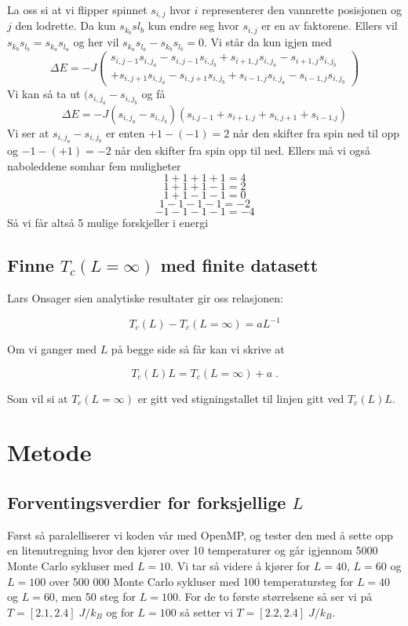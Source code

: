 \documentclass[reprint,english,notitlepage]{revtex4-1}  %
\begin{document}
La oss si at vi flipper spinnet $s_{i,j}$ hvor $i$ representerer den vannrette posisjonen og $j$ den lodrette. Da kun $s_{k_b}s{l_b}$ kun endre seg hvor $s_{i,j}$ er en av faktorene. Ellers vil $s_{k_b}s_{l_b}=s_{k_a}s_{l_a}$ og her vil $s_{k_a}s_{l_a}-s_{k_b}s_{l_b}=0$. Vi står da kun igjen med
$$
\Delta E= -J \begin{pmatrix} s_{i,j-1}s_{i,j_a}-s_{i,j-1}s_{i,j_b}+s_{i+1,j}s_{i,j_a}-s_{i+1,j}s_{i,j_b} \\+ s_{i,j+1}s_{i,j_a}-s_{i,j+1}s_{i,j_b}+s_{i-1,j}s_{i,j_a}-s_{i-1,j}s_{i,j_b}\end{pmatrix}
$$
Vi kan så ta ut $(s_{i,j_a}-s_{i,j_b}$ og få
$$
\Delta E=-J(s_{i,j_a}-s_{i,j_b})(
s_{i.j-1}+s_{i+1,j} +s_{i,j+1}+s_{i-1.j}
)
$$
Vi ser at $s_{i,j_a}-s_{i,j_b}$ er enten $+1-(-1)=2$ når den skifter fra spin ned til opp og $-1-(+1)=-2$ når den skifter fra spin opp til ned. Ellers må vi også naboleddene somhar fem muligheter
$$
1+1+1+1=4
$$
$$
1+1+1-1=2
$$
$$
1+1-1-1=0
$$
$$
1-1-1-1=-2
$$
$$
-1-1-1-1=-4
$$
Så vi får altså 5 mulige forskjeller i energi

\subsection*{Finne $T_c \left ( L = \infty \right ) $ med finite datasett}

Lars Onsager sien analytiske resultater gir oss relasjonen:

$$ T_c \left ( L \right ) - T_c \left ( L = \infty \right ) = aL^{-1}$$

Om vi ganger med $L$ på begge side så får kan vi skrive at

\begin{equation}\label{Tinf}
T_c \left (L \right ) L = T_c \left ( L = \infty \right ) + a \; .
\end{equation}

Som vil si at $T_c \left ( L = \infty \right ) $ er gitt ved stigningstallet til linjen gitt ved $T_c \left ( L \right ) L $.  

\section{Metode}

\subsection*{Forventingsverdier for forksjellige $L$}

Først så paralelliserer vi koden vår med OpenMP, og tester den med å sette opp en litenutregning hvor den kjører over 10 temperaturer og går igjennom 5000 Monte Carlo sykluser med $L = 10$. Vi tar så videre å kjører for $L = 40$, $L = 60$ og $L = 100$ over 500 000 Monte Carlo sykluser med 100 temperatursteg for $L = 40$ og $L = 60$, men 50 steg for $L = 100$. For de to første størrelsene så ser vi på $T = [2.1, 2.4] \; J/k_B$ og for $L = 100$ så setter vi $T = [2.2, 2.4] \; J/k_B$.
\end{document}
